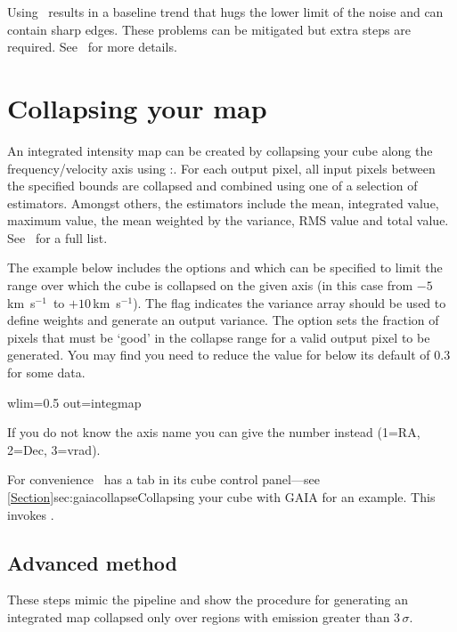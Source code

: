 \documentclass[11pt,oneside,chapters]{starlink}
\newcommand{\kms}{\mbox{$\,$km~s$^{-1}$}}   %
\newcommand{\kms}{\,km~s$^{-1}$}   %
\begin{document}
Using \findback\ results in a baseline trend that hugs the lower limit
of the noise and can contain sharp edges. These problems can be
mitigated but extra steps are required. See \cupidsun\ for more
details.

\section{Collapsing your map}

An integrated intensity map can be created by collapsing your cube
along the frequency/velocity axis using \Kappa:\collapse. For each
output pixel, all input pixels between the specified bounds are
collapsed and combined using one of a selection of estimators. Amongst
others, the estimators include the mean, integrated value, maximum
value, the mean weighted by the variance, RMS value and total value.
See \kappasun\ for a full list.

The example below includes the options  and 
which can be specified to limit the range over which the cube is
collapsed on the given axis (in this case from $-5$\kms\ to $+10$\kms).
The  flag indicates the variance array should be used
to define weights and generate an output variance. The option
 sets the fraction of pixels that must be `good' in the
collapse range for a valid output pixel to be generated. You may find
you need to reduce the value for  below its default of 0.3
for some data.

\begin{terminalv}
  wlim=0.5 out=integmap
\end{terminalv}
If you do not know the axis name you can give the number instead
(1=RA, 2=Dec, 3=vrad).

For convenience \gaia\ has a  tab in its cube
control panel---see \cref{Section}{sec:gaiacollapse}{Collapsing your
cube with GAIA} for an example.  This invokes \collapse.


\subsection{Advanced method}

These steps mimic the pipeline and show the procedure for generating
an integrated map collapsed only over regions with emission greater
than 3\,$\sigma$.
\end{document}
